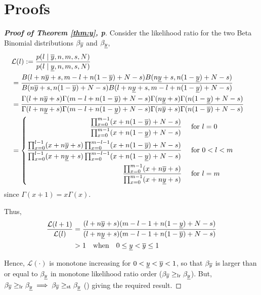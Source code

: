 \documentclass[12pt, a4paper]{elsarticle}
\begin{document}
\section{Proofs}
\label{ap:proofs}

\begin{proof}[\textbf{Proof of Theorem \ref{thm:y}, p\pageref{thm:y}}]
  \label{prf:y}
  Consider the likelihood ratio for the two Beta Binomial distributions $\beta_{\overline{y}}$ and $\beta_{\underline{y}}$,
  \begin{align*}
    \lefteqn{\mathcal{L}(l) := \frac{p(l \mid \yu, n, m, s, N)}{p(l \mid \yl, n, m, s, N)}} \\
    &= \frac{B(l + n \yu + s, m - l + n (1 - \yu) + N - s) B(n \yl + s, n (1 - \yl) + N - s)}
            {B(n \yu + s, n (1 - \yu) + N - s) B(l + n \yl + s, m - l + n (1 - \yl) + N - s)} \\
    &= \frac{\Gamma(l + n \yu + s) \Gamma(m - l + n (1 - \yu) + N - s) \Gamma(n \yl + s) \Gamma(n (1 - \yl) + N - s)}
            {\Gamma(l + n \yl + s) \Gamma(m - l + n (1 - \yl) + N - s) \Gamma(n \yu + s) \Gamma(n (1 - \yu) + N - s)} \\
    &= \left\{ \begin{aligned}
         \frac{\prod_{x=0}^{m-1} (x + n (1 - \yu) + N - s)}
              {\prod_{x=0}^{m-1} (x + n (1 - \yl) + N - s)} &\quad\mbox{ for } l=0 \\
         \frac{\prod_{x=0}^{l-1} (x + n \yu + s) \prod_{x=0}^{m-l-1} (x + n (1 - \yu) + N - s)}
              {\prod_{x=0}^{l-1} (x + n \yl + s) \prod_{x=0}^{m-l-1} (x + n (1 - \yl) + N - s)} &\quad\mbox{ for } 0<l<m \\
         \frac{\prod_{x=0}^{m-1} (x + n \yu + s)}
              {\prod_{x=0}^{m-1} (x + n \yl + s)} &\quad\mbox{ for } l=m
       \end{aligned} \right.
  \end{align*}
  since $\Gamma(x+1)=x \Gamma(x)$.
  
  Thus,
  \begin{align*}
    \frac{\mathcal{L}(l+1)}{\mathcal{L}(l)} &=
      \frac{(l + n \overline{y} + s) (m - l - 1 + n (1 - \underline{y}) + N - s)}
           {(l + n \underline{y} + s) (m - l - 1 + n (1 - \overline{y}) + N - s)} \\
    &> 1 \quad\mbox{when}\quad 0 \le \underline{y} < \overline{y} \le 1
  \end{align*}
    
  Hence, $\mathcal{L}(\cdot)$ is monotone increasing for $0 < \underline{y} < \overline{y} < 1$, so that $\beta_{\overline{y}}$ is larger than or equal to $\beta_{\underline{y}}$ in monotone likelihood ratio order ($\beta_{\overline{y}} \ge_\mathrm{lr} \beta_{\underline{y}}$).  But, $\beta_{\overline{y}} \ge_\mathrm{lr} \beta_{\underline{y}} \implies \beta_{\overline{y}} \ge_\mathrm{st} \beta_{\underline{y}}$ (\cite[Theorem 1.C.1, p.43]{shaked2007}) giving the required result.
\end{proof}
\end{document}

